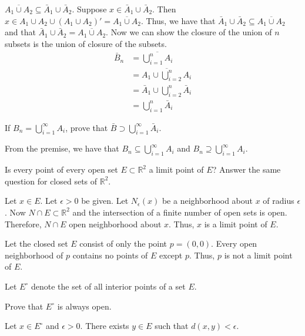 \begin{exercise}
\begin{exercise}[label = (\alph*), ref = \arabic{exercisei} (\alph*)]
    \(\overline{A_1\cup A_2}\subseteq\bar{A}_1\cup \bar{A}_2\).
    Suppose \(x\in\bar{A}_1\cup \bar{A}_2\).
    Then \(x\in A_1\cup A_2\cup (A_1\cup A_2)' = \overline{A_1\cup A_2}\).
    Thus, we have that
    \(\bar{A}_1\cup \bar{A}_2\subseteq\overline{A_1\cup A_2}\) and that
    \(\bar{A}_1\cup \bar{A}_2 = \overline{A_1\cup A_2}\).
    Now we can show the closure of the union of \(n\) subsets is the union of
    closure of the subsets.
    \begin{align*}
      \bar{B}_n & = \overline{\bigcup_{i = 1}^nA_i}\\
                & = \overline{A_1\cup\bigcup_{i = 2}^nA_i}\\
                & = \bar{A}_1\cup\bigcup_{i = 2}^n\bar{A}_i\\
                & = \bigcup_{i = 1}^n\bar{A}_i
    \end{align*}
  \item
    If \(B_n = \bigcup_{i = 1}^{\infty}A_i\), prove that
    \(\bar{B}\supset\bigcup_{i = 1}^{\infty}\bar{A}_i\).
    \par\smallskip
    From the premise, we have that \(B_n\subseteq\bigcup_{i = 1}^{\infty}A_i\)
    and \(B_n\supseteq\bigcup_{i = 1}^{\infty}A_i\).
  \end{exercise}
\item
  Is every point of every open set \(E\subset\mathbb{R}^2\) a limit point of
  \(E\)?
  Answer the same question for closed sets of \(\mathbb{R}^2\).
  \par\smallskip
  Let \(x\in E\).
  Let \(\epsilon > 0\) be given.
  Let \(N_{\epsilon}(x)\) be a neighborhood about \(x\) of radius \(\epsilon\).
  Now \(N\cap E\subset\mathbb{R}^2\) and the intersection of a finite number of
  open sets is open.
  Therefore, \(N\cap E\) open neighborhood about \(x\).
  Thus, \(x\) is a limit point of \(E\).
  \par\smallskip
  Let the closed set \(E\) consist of only the point \(p = (0, 0)\).
  Every open neighborhood of \(p\) contains no points of \(E\) except \(p\).
  Thus, \(p\) is not a limit point of \(E\).
\item
  Let \(E^{\circ}\) denote the set of all interior points of a set \(E\).
  \begin{exercise}[label = (\alph*)]
  \item
    Prove that \(E^{\circ}\) is always open.
    \par\smallskip
    Let \(x\in E^{\circ}\) and \(\epsilon > 0\).
    There exists \(y\in E\) such that \(d(x,y) < \epsilon\).

\end{exercise}
\end{exercise}
